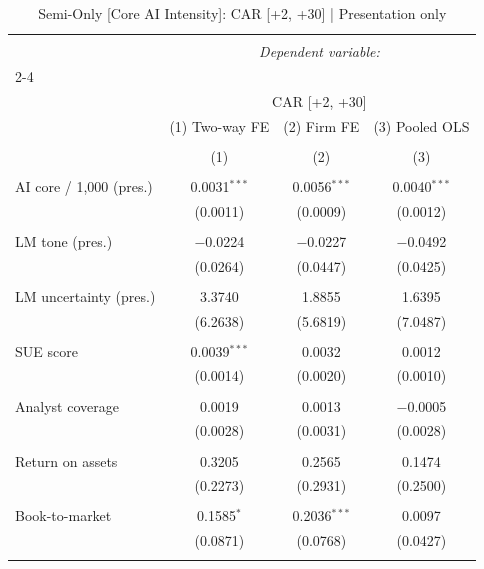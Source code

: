 
\begin{table}[!htbp] \centering 
  \caption{Semi-Only [Core AI Intensity]: CAR [+2, +30]  |  Presentation only} 
  \label{} 
\begin{tabular}{@{\extracolsep{5pt}}lccc} 
\\[-1.8ex]\hline 
\hline \\[-1.8ex] 
 & \multicolumn{3}{c}{\textit{Dependent variable:}} \\ 
\cline{2-4} 
\\[-1.8ex] & \multicolumn{3}{c}{CAR [+2, +30]} \\ 
 & (1) Two-way FE & (2) Firm FE & (3) Pooled OLS \\ 
\\[-1.8ex] & (1) & (2) & (3)\\ 
\hline \\[-1.8ex] 
 AI core / 1,000 (pres.) & 0.0031$^{***}$ & 0.0056$^{***}$ & 0.0040$^{***}$ \\ 
  & (0.0011) & (0.0009) & (0.0012) \\ 
  & & & \\ 
 LM tone (pres.) & $-$0.0224 & $-$0.0227 & $-$0.0492 \\ 
  & (0.0264) & (0.0447) & (0.0425) \\ 
  & & & \\ 
 LM uncertainty (pres.) & 3.3740 & 1.8855 & 1.6395 \\ 
  & (6.2638) & (5.6819) & (7.0487) \\ 
  & & & \\ 
 SUE score & 0.0039$^{***}$ & 0.0032 & 0.0012 \\ 
  & (0.0014) & (0.0020) & (0.0010) \\ 
  & & & \\ 
 Analyst coverage & 0.0019 & 0.0013 & $-$0.0005 \\ 
  & (0.0028) & (0.0031) & (0.0028) \\ 
  & & & \\ 
 Return on assets & 0.3205 & 0.2565 & 0.1474 \\ 
  & (0.2273) & (0.2931) & (0.2500) \\ 
  & & & \\ 
 Book-to-market & 0.1585$^{*}$ & 0.2036$^{***}$ & 0.0097 \\ 
  & (0.0871) & (0.0768) & (0.0427) \\ 
  & & & \\ 

\end{tabular}
\end{table}
